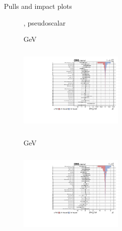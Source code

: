 \documentclass[8pt]{beamer}
\begin{document}
\begin{frame}{Pulls and impact plots}
\justifying
\begin{figure}[htbp]
\centering
\begin{block}{, pseudoscalar}\end{block}	\vspace{-8pt}

\begin{minipage}[b]{0.49\textwidth}
\begin{center}
\centering \begin{block}{ GeV}\end{block}	
\includegraphics[width=5.1cm, height=4.2cm]{figs/impacts_2017_both_pseudo_100.pdf}
\end{center}
\end{minipage}\hfill
\begin{minipage}[b]{0.49\textwidth}
\begin{center}
\centering \begin{block}{ GeV}\end{block}	
\includegraphics[width=5.1cm, height=4.2cm]{figs/impacts_2017_both_pseudo_500.pdf}
\end{center}
\end{minipage} \hfill
\end{figure}
\end{frame}
\end{document}
